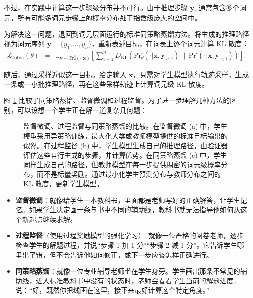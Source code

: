 \noindent 不过，在实践中计算这一步骤级分布并不可行。由于推理步骤 $\bar{\mathbf{y}}_t$ 通常包含多个词元，所有可能多词元步骤上的概率分布处于指数级庞大的空间中。

为解决这一问题，退回到词元层面运行的标准同策略蒸馏方法。将生成的推理路径视为词元序列 $\mathbf{y} = \{y_1,\dots, y_n\}$，重新表述目标，在词表上逐个词元计算 KL 散度：
\begin{eqnarray}
\mathcal{L}_{\mathrm{token}}(\theta) & = & \mathbb{E}_{\mathbf{y} \sim \mathrm{Pr}_{\theta}^{s}(\cdot|\mathbf{x})} \left[ \sum_{i=1}^{n} D_{\mathrm{KL}} \left( \mathrm{Pr}_{\theta}^{s}(\cdot | \mathbf{x}, \mathbf{y}_{<i}) \,\|\, \mathrm{Pr}^{t}(\cdot | \mathbf{x}, \mathbf{y}_{<i}) \right) \right].
\end{eqnarray}

\noindent 随后，通过采样近似这一目标。给定输入 $\mathbf{x}$，只需对学生模型执行轨迹采样，生成一条或一小批推理路径，再在这些采样轨迹上计算词元级 KL 散度。

图 \ref{fig:comparision-of-sft-ps-opd} 比较了同策略蒸馏、监督微调和过程监督。为了进一步理解几种方法的区别，可以设想一个学生正在解一道复杂几何题：

\begin{figure}[!t]
\centering

\caption{监督微调、过程监督与同策略蒸馏的比较。在监督微调 (a) 中，学生模型采用异策略训练，最大化人类或教师模型提供的标准目标输出的似然。在过程监督 (b) 中，学生模型生成自己的推理路径，由验证器评估这些自行生成的步骤，并计算优势。在同策略蒸馏 (c) 中，学生同样生成自己的路径，但教师模型在每一步提供稠密的词元级概率分布，而不是标量奖励。通过最小化学生预测分布与教师分布之间的 KL 散度，更新学生模型。}
\label{fig:comparision-of-sft-ps-opd}
\end{figure}

\begin{itemize}
\item \vspace{0.5em} \textbf{监督微调}：就像给学生一本教科书，里面都是老师写好的正确解答，让学生记忆。如果学生决定画一条与书中不同的辅助线，教科书就无法指导他如何从这个新起点继续求解。
\item \vspace{0.5em} \textbf{过程监督}（使用过程奖励模型的强化学习）：就像一位严格的阅卷老师，逐步检查学生的解题过程，并说“步骤 1 加 1 分”“步骤 2 减 1 分”。它告诉学生哪里出了错，但不会告诉他如何修正，或下一步应该怎样正确进行。
\item \textbf{同策略蒸馏}：就像一位专业辅导老师坐在学生身旁。学生画出那条不常见的辅助线，进入标准教科书中没有的状态时，老师会看着学生当前的解题进度，说：“好，既然你把线画在这里，接下来最好计算这个特定角度。”
\end{itemize}


